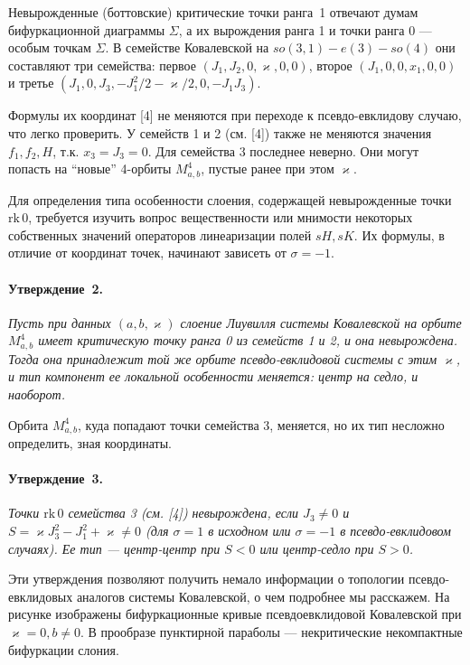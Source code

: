 \documentclass{vzmsthesis}
\begin{document}
Невырожденные (боттовские) критические точки ранга~1 отвечают думам бифуркационной диаграммы $\Sigma$, а их вырождения ранга 1 и точки ранга 0 --- особым точкам $\Sigma$. В семействе Ковалевской на $so(3,1)-e(3)-so(4)$ они составляют три семейства: первое $(J_1, J_2, 0, \varkappa, 0 , 0)$, второе $(J_1, 0, 0, x_1, 0 , 0)$ и третье $(J_1, 0, J_3, -J_1^2/2 -\varkappa/2, 0 , -J_1 J_3)$. 

Формулы их координат [4] не меняются при переходе к псевдо-евклидову случаю, что легко проверить. У семейств 1 и 2 (см. [4]) также не меняются значения $f_1, f_2, H$, т.к. $x_3 = J_3 = 0$. Для семейства $3$ последнее неверно. Они могут попасть на ``новые'' 4-орбиты $M^4_{a, b}$, пустые ранее при этом $\varkappa$.

Для определения типа особенности слоения, содержащей невырожденные точки $\mathrm{rk}\,0$, требуется изучить вопрос вещественности или мнимости некоторых собственных значений операторов линеаризации полей $sH, sK$. Их формулы, в отличие от координат точек, начинают зависеть от $\sigma = -1$. 

\paragraph{Утверждение~2.}
{\it
	Пусть при данных $(a, b, \varkappa)$ слоение Лиувилля системы Ковалевской на орбите $M^4_{a, b}$ имеет критическую точку ранга 0 из семейств 1 и 2, и она невырождена. Тогда она принадлежит той же орбите псевдо-евклидовой системы с этим $\varkappa$, и тип компонент ее локальной особенности меняется: центр на седло, и наоборот. 
}

Орбита $M^4_{a, b}$, куда попадают точки семейства 3, меняется, но их тип несложно определить, зная координаты. 

\paragraph{Утверждение~3.}
{\it
	Точки $\mathrm{rk}\,0$ семейства 3 (см. [4]) невырождена, если $J_3 \ne 0$ и $S = \varkappa J_3^2 - J_1^2 + \varkappa \ne 0$ (для $\sigma = 1$ в исходном или $\sigma = -1$ в псевдо-евклидовом случаях). Ее тип --- центр-центр при $S<0$ или центр-седло при $S >0$.
}

Эти утверждения позволяют получить немало информации о топологии псевдо-евклидовых аналогов системы Ковалевской, о чем подробнее мы расскажем. На рисунке изображены бифуркационные кривые псевдоевклидовой Ковалевской при $\varkappa = 0, b \ne 0$. В прообразе пунктирной параболы --- некритические некомпактные бифуркации слония.
\end{document}
